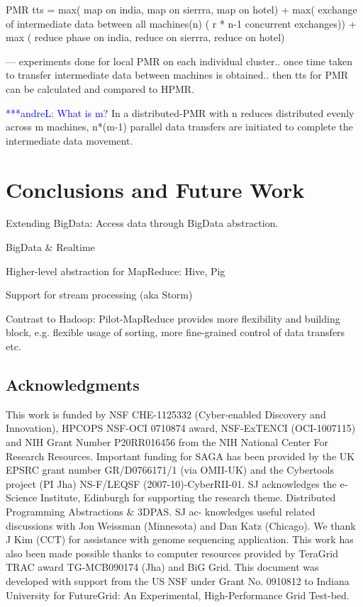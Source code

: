 \documentclass{acm_proc_article-sp}
\newcommand{\alnote}[1]{ {\textcolor{blue} { ***andreL: #1 }}}
\newcommand{\alnote}[1]{}
\begin{document}
PMR tts = max( map  on india, map on  sierrra, map on hotel) + max( exchange of intermediate data between all machines(n) ( r * n-1 concurrent exchanges)) + max ( reduce phase on  india, reduce on  sierrra, reduce on hotel)

--- experiments done for local PMR on each individual cluster.. once time 
taken to transfer intermediate data between machines is obtained.. then tts 
for PMR can be calculated and compared to HPMR.

\alnote{What is m?}
In a distributed-PMR with n reduces 
distributed evenly across m machines, n*(m-1) parallel data transfers 
are initiated to complete the intermediate data movement.

\section{Conclusions and Future Work}
\label{sec-conclusion}

Extending BigData: Access data through BigData abstraction.

BigData \& Realtime

Higher-level abstraction for MapReduce: Hive, Pig


Support for stream processing (aka Storm)

Contrast to Hadoop:
Pilot-MapReduce provides more flexibility and building block, e.g. flexible 
usage of sorting, more fine-grained control of data transfers etc.

%

%
%
%


\subsection*{Acknowledgments}
\scriptsize
This work is funded by NSF CHE-1125332 (Cyber-enabled Discovery and
Innovation), HPCOPS NSF-OCI 0710874 award, NSF-ExTENCI (OCI-1007115) and NIH
Grant Number P20RR016456 from the NIH National Center For Research
Resources. Important funding for SAGA has been provided by the UK EPSRC grant
number GR/D0766171/1 (via OMII-UK) and the Cybertools project (PI Jha) 
NS-F/LEQSF (2007-10)-CyberRII-01. SJ acknowledges the e-Science Institute,
Edinburgh for supporting the research theme. Distributed Programming
Abstractions \& 3DPAS. SJ ac- knowledges useful related discussions with Jon
Weissman (Minnesota) and Dan Katz (Chicago). We thank J Kim (CCT) for
assistance with genome sequencing application. This work has also been made
possible thanks to computer resources provided by TeraGrid TRAC award
TG-MCB090174 (Jha) and BiG Grid. This document was developed with support from
the US NSF under Grant No. 0910812 to Indiana University for FutureGrid: An
Experimental, High-Performance Grid Test-bed.
\end{document}
